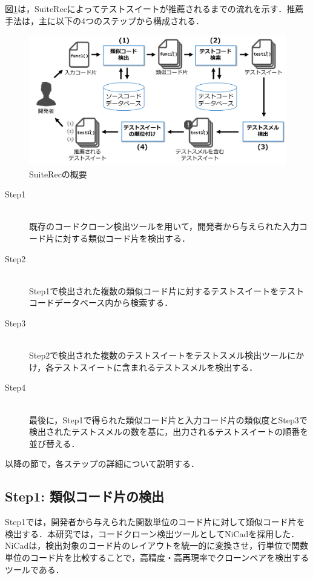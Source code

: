 \documentclass[12pt]{jarticle} %
\begin{document}
図\ref{SO}は，{\sf SuiteRec}によってテストスイートが推薦されるまでの流れを示す．推薦手法は，主に以下の4つのステップから構成される．

\begin{figure}[htbp]
\begin{center}
\includegraphics[clip,width=15cm]{image/SuiteRec-outline.pdf}
\caption{{\sf SuiteRec}の概要}
\label{SO}
\end{center}
\end{figure}

\newpage
\begin{description}
\item[Step1]~\\
既存のコードクローン検出ツールを用いて，開発者から与えられた入力コード片に対する類似コード片を検出する．
\item[Step2]~\\
Step1で検出された複数の類似コード片に対するテストスイートをテストコードデータベース内から検索する．
\item[Step3]~\\
Step2で検出された複数のテストスイートをテストスメル検出ツールにかけ，各テストスイートに含まれるテストスメルを検出する．
\item[Step4]~\\
最後に，Step1で得られた類似コード片と入力コード片の類似度とStep3で検出されたテストスメルの数を基に，出力されるテストスイートの順番を並び替える．
\end{description}

以降の節で，各ステップの詳細について説明する．

\subsection{Step1: 類似コード片の検出}

Step1では，開発者から与えられた関数単位のコード片に対して類似コード片を検出する．本研究では，コードクローン検出ツールとして{\sf NiCad}\cite{b2}を採用した．{\sf NiCad}は，検出対象のコード片のレイアウトを統一的に変換させ，行単位で関数単位のコード片を比較することで，高精度・高再現率でクローンペアを検出するツールである．
\end{document}
